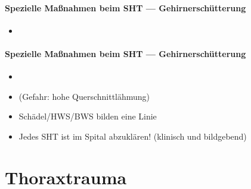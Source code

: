 \begin{gMassnahmenEnv}
    \paragraph{Spezielle Maßnahmen beim SHT ---
    Gehirnerschütterung}
    \begin{itemize}
        \item 
    \end{itemize}
\end{gMassnahmenEnv}

\begin{gMassnahmenEnv}
    \paragraph{Spezielle Maßnahmen beim SHT ---
    Gehirnerschütterung}
    \begin{itemize}
        \item 
    \end{itemize}
\end{gMassnahmenEnv}



\begin{itemize}
\item (Gefahr: hohe Querschnittl\"ahmung)

\end{itemize}
\begin{itemize}
\item Sch\"adel/HWS/BWS bilden eine Linie

\end{itemize}
\begin{itemize}
\item Jedes SHT ist im Spital abzukl\"aren! (klinisch und  bildgebend)

\end{itemize}






\section{Thoraxtrauma}

